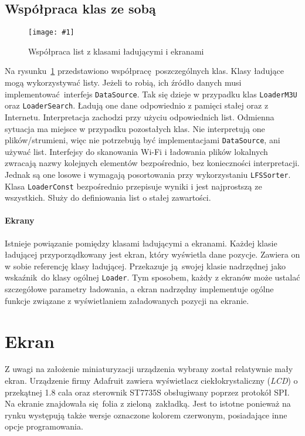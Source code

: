 \documentclass[12pt]{report}
\newcommand{\imgint}[4]{
	\begin{figure}[{#4}]
		\centering
		\texttt{[image: \#1]}
		\caption{#2}
		\label{#1}
	\end{figure}
}
\newcommand{\imgh}[3]{\imgint{#1}{#2}{#3}{H}}
\begin{document}
		\subsection{Współpraca klas ze sobą}
			\imgh{3/PicoRadio-loaders}{Współpraca list z klasami ładującymi i ekranami}{0.95}
			Na rysunku~\ref{3/PicoRadio-loaders} przedstawiono współpracę poszczególnych klas. Klasy ładujące mogą wykorzystywać listy. Jeżeli to robią, ich źródło danych musi implementować interfejs \lstinline|DataSource|. Tak się dzieje w przypadku klas \lstinline|LoaderM3U| oraz \lstinline|LoaderSearch|. Ładują one dane odpowiednio z pamięci stałej oraz z Internetu. Interpretacja zachodzi przy użyciu odpowiednich list. Odmienna sytuacja ma miejsce w przypadku pozostałych klas. Nie interpretują one plików/strumieni, więc nie potrzebują być implementacjami \lstinline|DataSource|, ani używać list. Interfejsy do skanowania Wi-Fi i ładowania plików lokalnych zwracają nazwy kolejnych elementów bezpośrednio, bez konieczności interpretacji. Jednak są one losowe i wymagają posortowania przy wykorzystaniu \lstinline|LFSSorter|. Klasa \lstinline|LoaderConst| bezpośrednio przepisuje wyniki i jest najprostszą ze wszystkich. Służy do definiowania list o stałej zawartości.
			
			\paragraph{Ekrany}
				Istnieje powiązanie pomiędzy klasami ładującymi a ekranami. Każdej klasie ładującej przyporządkowany jest ekran, który wyświetla dane pozycje. Zawiera on w sobie referencję klasy ładującej. Przekazuje ją swojej klasie nadrzędnej jako wskaźnik do klasy ogólnej \lstinline|Loader|. Tym sposobem, każdy z ekranów może ustalać szczegółowe parametry ładowania, a ekran nadrzędny implementuje ogólne funkcje związane z wyświetlaniem załadowanych pozycji na ekranie.
	
	\section{Ekran}
		\label{sec:screen}
		Z uwagi na założenie miniaturyzacji urządzenia wybrany został relatywnie mały ekran. Urządzenie firmy Adafruit zawiera wyświetlacz ciekłokrystaliczny (\textit{LCD}) o przekątnej 1.8 cala oraz sterownik ST7735S obsługiwany poprzez protokół SPI. Na ekranie znajdowała się folia z zieloną zakładką. Jest to istotne ponieważ na rynku występują także wersje oznaczone kolorem czerwonym, posiadające inne opcje programowania.
		$ $\\
		
\end{document}
